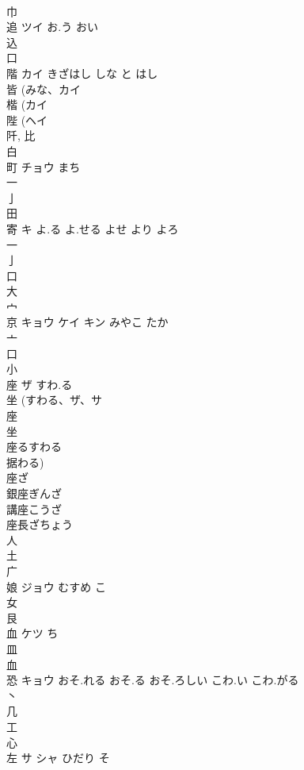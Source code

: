 \documentclass[8pt]{extreport}
\begin{document}
\begin{CJK}{UTF8}{min}
\\	巾 
\\	追	ツイ	お.う おい	
\\	込 
\\	口 
\\	階	カイ	きざはし しな と はし	
\\	皆 (みな、カイ 
\\	楷 (カイ 
\\	陛 (ヘイ 
\\	阡, 比 
\\	白 
\\	町	チョウ	まち	
\\	一 
\\	亅 
\\	田 
\\	寄	キ	よ.る よ.せる よせ より よろ	
\\	一 
\\	亅 
\\	口 
\\	大 
\\	宀 
\\	京	キョウ ケイ キン	みやこ たか	
\\	亠 
\\	口 
\\	小 
\\	座	ザ	すわ.る	
\\	坐 (すわる、ザ、サ 
\\	座 
\\	坐 
\\	座るすわる 
\\	据わる) 
\\	座ざ 
\\	銀座ぎんざ 
\\	講座こうざ 
\\	座長ざちょう 
\\	人 
\\	土 
\\	广 
\\	娘	ジョウ	むすめ こ	
\\	女 
\\	艮 
\\	血	ケツ	ち	
\\	皿 
\\	血 
\\	恐	キョウ	おそ.れる おそ.る おそ.ろしい こわ.い こわ.がる	
\\	丶 
\\	几 
\\	工 
\\	心 
\\	左	サ シャ	ひだり そ	

\end{CJK}
\end{document}
